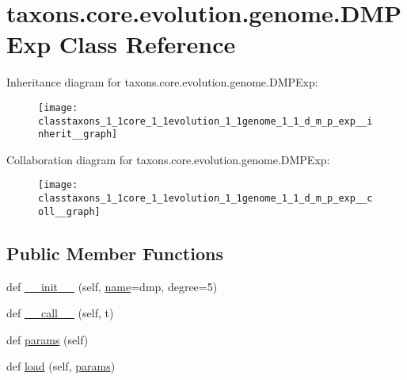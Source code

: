 \hypertarget{classtaxons_1_1core_1_1evolution_1_1genome_1_1_d_m_p_exp}{}\section{taxons.\+core.\+evolution.\+genome.\+D\+M\+P\+Exp Class Reference}
\label{classtaxons_1_1core_1_1evolution_1_1genome_1_1_d_m_p_exp}


Inheritance diagram for taxons.\+core.\+evolution.\+genome.\+D\+M\+P\+Exp\+:
\nopagebreak
\begin{figure}[H]
\begin{center}
\leavevmode
\texttt{[image: classtaxons\_1\_1core\_1\_1evolution\_1\_1genome\_1\_1\_d\_m\_p\_exp\_\_inherit\_\_graph]}
\end{center}
\end{figure}


Collaboration diagram for taxons.\+core.\+evolution.\+genome.\+D\+M\+P\+Exp\+:
\nopagebreak
\begin{figure}[H]
\begin{center}
\leavevmode
\texttt{[image: classtaxons\_1\_1core\_1\_1evolution\_1\_1genome\_1\_1\_d\_m\_p\_exp\_\_coll\_\_graph]}
\end{center}
\end{figure}
\subsection*{Public Member Functions}
\begin{DoxyCompactItemize}
\item 
def \hyperlink{classtaxons_1_1core_1_1evolution_1_1genome_1_1_d_m_p_exp_a72740682a007ed629a6b09e57cfe57b6}{\+\_\+\+\_\+init\+\_\+\+\_\+} (self, \hyperlink{classtaxons_1_1core_1_1evolution_1_1genome_1_1_d_m_p_exp_a11ab58d138a2a1aac8a2bac2e89fa964}{name}=\textquotesingle{}dmp\textquotesingle{}, degree=5)
\item 
def \hyperlink{classtaxons_1_1core_1_1evolution_1_1genome_1_1_d_m_p_exp_a57ff367775ec518fac97fa9f6f5b3adf}{\+\_\+\+\_\+call\+\_\+\+\_\+} (self, t)
\item 
def \hyperlink{classtaxons_1_1core_1_1evolution_1_1genome_1_1_d_m_p_exp_acfd7aea680e66aa64c823037305ce410}{params} (self)
\item 
def \hyperlink{classtaxons_1_1core_1_1evolution_1_1genome_1_1_d_m_p_exp_aed398bdc4d7211069f5d187adc6ee828}{load} (self, \hyperlink{classtaxons_1_1core_1_1evolution_1_1genome_1_1_d_m_p_exp_acfd7aea680e66aa64c823037305ce410}{params})
\end{DoxyCompactItemize}
